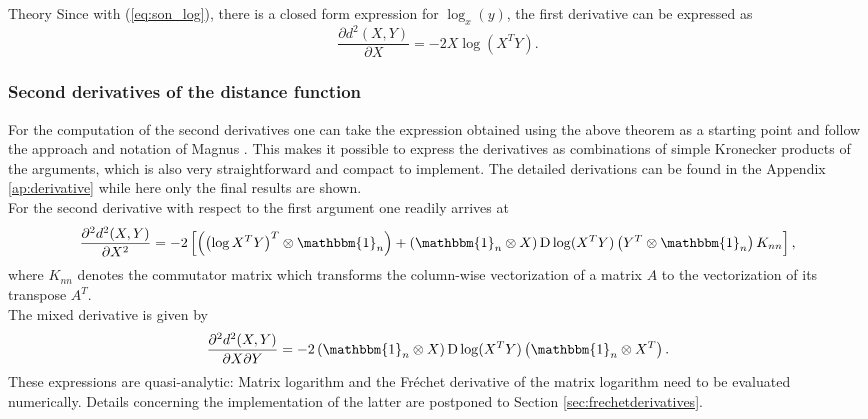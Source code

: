 \begin{chapter}{Theory}
Since with (\ref{eq:son_log}), there is a closed form expression for $\log_x(y)$, the first derivative can be expressed as
\begin{equation}
    \frac{\partial d^2(X,Y)}{\partial X} = -2X\log(X^TY).
\end{equation}

\subsubsection{Second derivatives of the distance function} %
\label{ssub:SecondDerSO}
For the computation of the second derivatives one can take the expression obtained using the above theorem as a starting point and follow the approach and notation of Magnus \cite{Magnus}. 
This makes it possible to express the derivatives as combinations of simple Kronecker products of the arguments, which is also very straightforward and compact to implement. 
The detailed derivations can be found in the Appendix \ref{ap:derivative} while here only the final results are shown. \\
For the second derivative with respect to the first argument one readily arrives at
\begin{equation}
    \label{eq:son_xx_der}
    \frac{\partial^2 d^2(X,Y)}{\partial X^2} = -2\left[\left(\left(\log X^TY\right)^T\otimes\mathbbm{1}_n\right) + \left(\mathbbm{1}_n\otimes X \right)\operatorname{D}\log(X^TY) \left(Y^T\otimes\mathbbm{1}_n \right) K_{nn}\right],
\end{equation}
where $K_{nn}$ denotes the commutator matrix which transforms the column-wise vectorization of a matrix $A$ to the vectorization of its transpose $A^T$.\\

The mixed derivative is given by
\begin{equation}
    \label{eq:son_xy_der}
    \frac{\partial^2 d^2(X,Y)}{\partial X\partial Y} = -2\left(\mathbbm{1}_n\otimes X \right)\operatorname{D}\log(X^TY) \left(\mathbbm{1}_n\otimes X^T \right).
\end{equation}
These expressions are quasi-analytic: Matrix logarithm and the Fr\'{e}chet derivative of the matrix logarithm need to be evaluated numerically. Details concerning the 
implementation of the latter are postponed to Section \ref{sec:frechetderivatives}.


\end{chapter}
